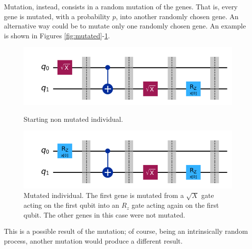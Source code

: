 \documentclass[12pt]{article}
\begin{document}
Mutation, instead, consists in a random mutation of the genes. That is, every gene is mutated, with a probability $p$, into another randomly chosen gene. An alternative way could be to mutate only one randomly chosen gene. An example is shown in Figures \ref{fig:mutated}-\ref{fig:nonmutated}.  
\begin{figure}[h!]
    \centering
    \begin{minipage}{0.7\textwidth}
        \centering
        \includegraphics[width=\linewidth]{images/mutated.png}
        \caption{Starting non mutated individual.}
        \label{fig:mutated}
    \end{minipage}
    \hfill
    \begin{minipage}{0.7\textwidth}
        \centering
        \includegraphics[width=\linewidth]{images/nonmutated.png}
        \caption{Mutated individual. The first gene is mutated from a $\sqrt{X}$ gate acting on the first qubit into an $R_z$ gate acting again on the first qubit. The other genes in this case were not mutated.}
        \label{fig:nonmutated}
    \end{minipage}
\end{figure}
This is a possible result of the mutation; of course, being an intrinsically random process, another mutation would produce a different result.  
\end{document}
